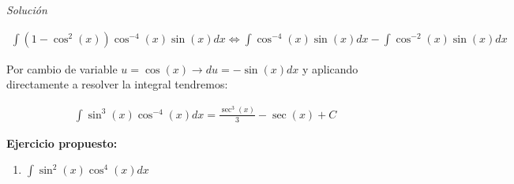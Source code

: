 \textit{Solución}

\begin{equation*}
    \begin{gathered}
        \int(1-\cos^{2}(x))\cos^{-4}(x)\sin(x)dx \Leftrightarrow \int\cos^{-4}(x)\sin(x)dx - \int\cos^{-2}(x)\sin(x)dx
    \end{gathered}
\end{equation*}

Por cambio de variable \(\displaystyle u=\cos(x) \rightarrow du=-\sin(x)dx\) y aplicando directamente a resolver la integral tendremos:

\begin{equation*}
    \begin{gathered}
        \int\sin^{3}(x)\cos^{-4}(x)dx = \frac{\sec^{3}(x)}{3}-\sec(x) +C
    \end{gathered}
\end{equation*}

\textbf{Ejercicio propuesto:}
\begin{enumerate}
  \item \(\displaystyle\int\sin^{2}(x)\cos^{4}(x)dx\)
\end{enumerate}
\clearpage